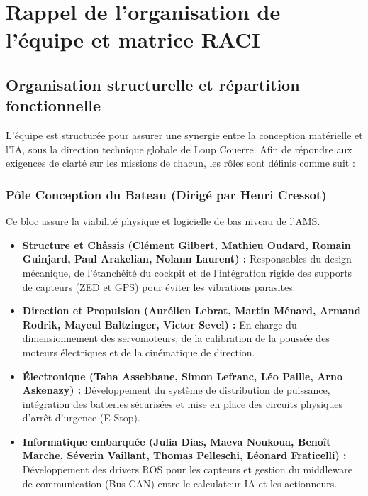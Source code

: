\documentclass[11pt, a4paper]{article}
\begin{document}
\section{Rappel de l’organisation de l’équipe et matrice RACI}
\subsection{Organisation structurelle et répartition fonctionnelle}
L'équipe est structurée pour assurer une synergie entre la conception matérielle et l'IA, sous la direction technique globale de Loup Couerre. Afin de répondre aux exigences de clarté sur les missions de chacun, les rôles sont définis comme suit :

\subsubsection{Pôle Conception du Bateau (Dirigé par Henri Cressot)}
Ce bloc assure la viabilité physique et logicielle de bas niveau de l'AMS.
\begin{itemize}
    \item \textbf{Structure et Châssis (Clément Gilbert, Mathieu Oudard, Romain Guinjard, Paul Arakelian, Nolann Laurent) :} Responsables du design mécanique, de l'étanchéité du cockpit et de l'intégration rigide des supports de capteurs (ZED et GPS) pour éviter les vibrations parasites.
    \item \textbf{Direction et Propulsion (Aurélien Lebrat, Martin Ménard, Armand Rodrik, Mayeul Baltzinger, Victor Sevel) :} En charge du dimensionnement des servomoteurs, de la calibration de la poussée des moteurs électriques et de la cinématique de direction.
    \item \textbf{Électronique (Taha Assebbane, Simon Lefranc, Léo Paille, Arno Askenazy) :} Développement du système de distribution de puissance, intégration des batteries sécurisées et mise en place des circuits physiques d'arrêt d'urgence (E-Stop).
    \item \textbf{Informatique embarquée (Julia Dias, Maeva Noukoua, Benoît Marche, Séverin Vaillant, Thomas Pelleschi, Léonard Fraticelli) :} Développement des drivers ROS pour les capteurs et gestion du middleware de communication (Bus CAN) entre le calculateur IA et les actionneurs.
\end{itemize}
\end{document}
